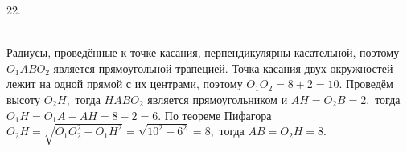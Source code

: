 22. \begin{figure}[ht!]
\end{figure}\\
Радиусы, проведённые к точке касания, перпендикулярны касательной, поэтому $O_1ABO_2$ является прямоугольной трапецией. Точка касания двух окружностей лежит на одной прямой с их центрами, поэтому $O_1O_2=8+2=10.$ Проведём высоту $O_2H,$ тогда $HABO_2$ является прямоугольником и $AH=O_2B=2,$ тогда $O_1H=O_1A-AH=8-2=6.$ По теореме Пифагора $O_2H=\sqrt{O_1O_2^2-O_1H^2}=\sqrt{10^2-6^2}=8,$ тогда $AB=O_2H=8.$\\
